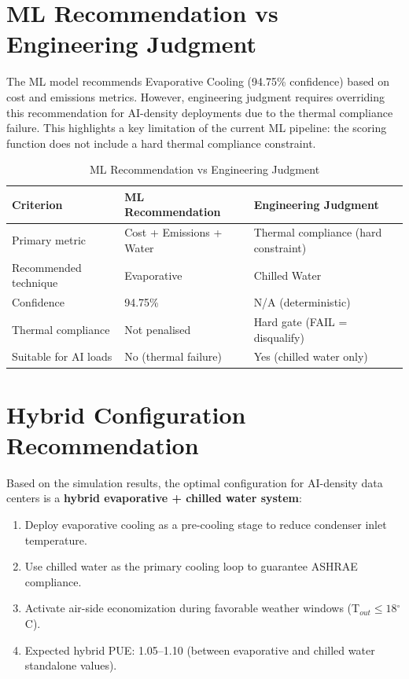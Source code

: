 \documentclass[12pt,a4paper]{report}
\newcommand{\degC}{$^{\circ}$C}
\begin{document}
\section{ML Recommendation vs Engineering Judgment}

The ML model recommends Evaporative Cooling (94.75\% confidence) based on cost and emissions
metrics. However, engineering judgment requires overriding this recommendation for AI-density
deployments due to the thermal compliance failure. This highlights a key limitation of the
current ML pipeline: the scoring function does not include a hard thermal compliance constraint.

\begin{table}[H]
\centering
\caption{ML Recommendation vs Engineering Judgment}
\label{tab:ml_vs_eng}
\renewcommand{\arraystretch}{1.3}
\begin{tabular}{lll}
\toprule
\textbf{Criterion} & \textbf{ML Recommendation} & \textbf{Engineering Judgment} \\
\midrule
Primary metric & Cost + Emissions + Water & Thermal compliance (hard constraint) \\
Recommended technique & Evaporative & Chilled Water \\
Confidence & 94.75\% & N/A (deterministic) \\
Thermal compliance & Not penalised & Hard gate (FAIL = disqualify) \\
Suitable for AI loads & No (thermal failure) & Yes (chilled water only) \\
\bottomrule
\end{tabular}
\end{table}

\section{Hybrid Configuration Recommendation}

Based on the simulation results, the optimal configuration for AI-density data centers is a
\textbf{hybrid evaporative + chilled water system}:

\begin{enumerate}[noitemsep]
  \item Deploy evaporative cooling as a pre-cooling stage to reduce condenser inlet temperature.
  \item Use chilled water as the primary cooling loop to guarantee ASHRAE compliance.
  \item Activate air-side economization during favorable weather windows (T$_{out} \leq 18$\degC).
  \item Expected hybrid PUE: 1.05--1.10 (between evaporative and chilled water standalone values).
\end{enumerate}
\end{document}
